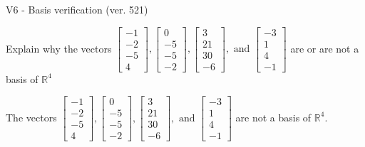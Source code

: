 \begin{exercise}
  \begin{exerciseTitle}V6 - Basis verification (ver. 521)\end{exerciseTitle}
  \begin{exerciseStatement}
    Explain why the vectors \(\left[\begin{array}{r}
-1 \\
-2 \\
-5 \\
4
\end{array}\right] , \left[\begin{array}{r}
0 \\
-5 \\
-5 \\
-2
\end{array}\right] , \left[\begin{array}{r}
3 \\
21 \\
30 \\
-6
\end{array}\right] , \text{ and } \left[\begin{array}{r}
-3 \\
1 \\
4 \\
-1
\end{array}\right]\) are or are not a basis of \(\mathbb{R}^4\)	


  \end{exerciseStatement}
  \begin{exerciseAnswer}
   The vectors \(\left[\begin{array}{r}
-1 \\
-2 \\
-5 \\
4
\end{array}\right] , \left[\begin{array}{r}
0 \\
-5 \\
-5 \\
-2
\end{array}\right] , \left[\begin{array}{r}
3 \\
21 \\
30 \\
-6
\end{array}\right] , \text{ and } \left[\begin{array}{r}
-3 \\
1 \\
4 \\
-1
\end{array}\right]\) 
  	 are not  a basis of \(\mathbb{R}^4\).
  


  \end{exerciseAnswer}
\end{exercise}
